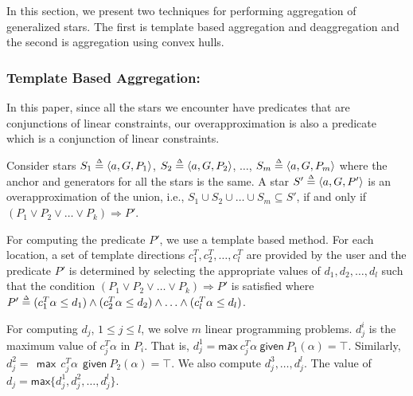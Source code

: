 In this section, we present two techniques for performing aggregation of generalized stars. The first is template based aggregation and deaggregation and the second is aggregation using convex hulls.
%


\subsubsection{Template Based Aggregation:}
\label{sec:templateAgg}
In this paper, since all the stars we encounter have predicates that are conjunctions of linear constraints, our overapproximation is also a predicate which is a conjunction of linear constraints. 

\begin{lemma}
\label{lem:agg}
Consider stars $S_1 \deq \tup{a, G, P_1}$, $S_2 \deq \tup{a, G, P_2}$, $\ldots$, $S_m \deq \tup{a, G, P_m}$ where the anchor and generators for all the stars is the same.
%
A star $S' \deq \tup{a, G, P'}$ is an overapproximation of the union, i.e., $S_1 \cup S_2 \cup \ldots \cup S_m \subseteq S'$, if and only if $(P_1 \vee P_2 \vee \ldots \vee P_k) \Rightarrow P'$.
\end{lemma}

 For computing the predicate $P'$, we use a template based method.
%
%
For each location, a set of template directions $c_1^{T}, c_2^{T}, \ldots, c_{l}^{T}$ are provided by the user and the predicate $P'$ is determined by selecting the appropriate values of $d_1, d_2, \ldots, d_l$ such that the condition $(P_1 \vee P_2 \vee \ldots \vee P_k) \Rightarrow P'$ is satisfied where $P' \mathrel{\stackrel{\scriptscriptstyle\Delta}{=}} (c_1^{T}\alpha \leq d_1) \wedge (c_2^{T}\alpha \leq d_2) \wedge \ldots \wedge (c_l^{T}\alpha \leq d_l)$. 

For computing $d_j$, $1 \leq j \leq l$, we solve $m$ linear programming problems. $d_j^i$ is the maximum value of $c_j^T \alpha$ in $P_i$. That is, $d_j^1 = \mathsf{max}~ c_j^T \alpha~ \mathsf{given} ~P_1(\alpha) = \top$. Similarly, $d_j^2 = ~~\mathsf{max}~~ c_j^T \alpha~~ \mathsf{given} ~P_2(\alpha) = \top$. We also compute $d_j^3, \ldots, d_j^l$. The value of $d_j = \mathsf{max} \{d_j^1, d_j^2, \ldots, d_j^l\}$.

